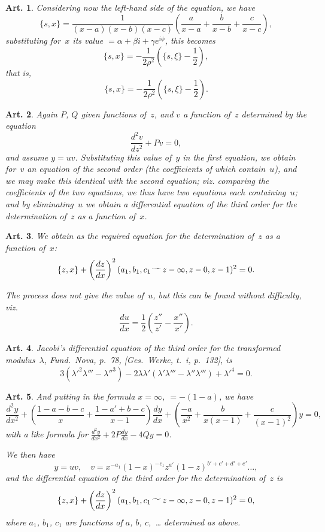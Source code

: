 \documentclass[11pt,a4paper]{article}
\theoremstyle{plain}
\newtheorem{art}{Art.}[section]
\begin{document}
\begin{art}
Considering now the left-hand side of the equation, we have
\[
\{s, x\} = \frac{1}{(x-a)(x-b)(x-c)} \left(\frac{a}{x-a} + \frac{b}{x-b} + \frac{c}{x-c}\right),
\]
substituting for~$x$ its value $= \alpha + \beta i + \gamma e^{i\phi}$, this becomes
\[
\{s, x\} = -\frac{1}{2\rho^2} \left(\{s, \xi\} - \frac{1}{2}\right),
\]
that is,
\[
\{s, x\} = -\frac{1}{2\rho^2} \left(\{s, \xi\} - \frac{1}{2}\right).
\]
\end{art}

\begin{art}
Again $P$, $Q$ given functions of~$z$, and $v$ a function of~$z$ determined
by the equation
\[
\frac{d^2v}{dz^2} + Pv = 0,
\]
and assume $y = uv$. Substituting this value of~$y$ in the first equation,
we obtain for~$v$ an equation of the second order (the coefficients of which
contain~$u$), and we may make this identical with the second equation;
viz. comparing the coefficients of the two equations, we thus have two
equations each containing~$u$; and by eliminating~$u$ we obtain a
differential equation of the third order for the determination of~$z$ as a
function of~$x$.
\end{art}

\begin{art}
We obtain as the required equation for the determination of~$z$ as a
function of~$x$:
\[
\{z, x\} + \left(\frac{dz}{dx}\right)^2 (a_1, b_1, c_1 \,\raisebox{-.5ex}{$\widetilde{\phantom{aa}}$}\, z-\infty, z-0, z-1)^2 = 0.
\]

The process does not give the value of~$u$, but this can be found without
difficulty, viz.
\[
\frac{du}{dx} = \frac{1}{2} \left(\frac{z''}{z'} - \frac{x''}{x'}\right).
\]
\end{art}

\begin{art}
Jacobi's differential equation of the third order for the transformed
modulus~$\lambda$, \textit{Fund.~Nova}, p.~78, [Ges.\ Werke, t.~i, p.~132], is
\[
3(\lambda'^2 \lambda''' - \lambda''^3) - 2\lambda \lambda' (\lambda' \lambda''' - \lambda'' \lambda''') + \lambda'^4 = 0.
\]
\end{art}

\begin{art}
And putting in the formula $x = \infty$, $= -(1-a)$, we have
\[
\frac{d^2y}{dx^2} + \left(\frac{1-a-b-c}{x} + \frac{1-a'+b-c}{x-1}\right) \frac{dy}{dx}
+ \left(\frac{-a}{x^2} + \frac{b}{x(x-1)} + \frac{c}{(x-1)^2}\right) y = 0,
\]
with a like formula for $\frac{d^2y}{dx^2} + 2P \frac{dy}{dx} - 4Qy = 0$.

We then have
\[
y = uv, \quad v = x^{-a_1} (1-x)^{-c_1} z^{a'} (1-z)^{b'+c'+d'+e'} \ldots,
\]
and the differential equation of the third order for the determination
of~$z$ is
\[
\{z, x\} + \left(\frac{dz}{dx}\right)^2 (a_1, b_1, c_1 \,\raisebox{-.5ex}{$\widetilde{\phantom{aa}}$}\, z-\infty, z-0, z-1)^2 = 0,
\]
where $a_1$, $b_1$, $c_1$ are functions of $a$, $b$, $c$,~\ldots
determined as above.
\end{art}
\end{document}
